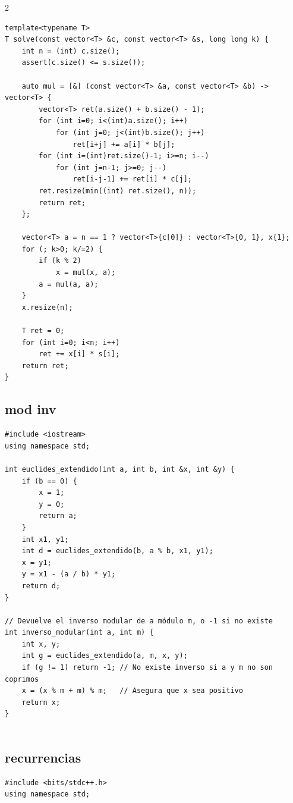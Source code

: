 \documentclass[twoside]{article}
\begin{document}
\begin{multicols*}{2}
\begin{verbatim}
template<typename T>
T solve(const vector<T> &c, const vector<T> &s, long long k) {
    int n = (int) c.size();
    assert(c.size() <= s.size());

    auto mul = [&] (const vector<T> &a, const vector<T> &b) -> vector<T> {
        vector<T> ret(a.size() + b.size() - 1);
        for (int i=0; i<(int)a.size(); i++)
            for (int j=0; j<(int)b.size(); j++)
                ret[i+j] += a[i] * b[j];
        for (int i=(int)ret.size()-1; i>=n; i--)
            for (int j=n-1; j>=0; j--)
                ret[i-j-1] += ret[i] * c[j];
        ret.resize(min((int) ret.size(), n));
        return ret;
    };

    vector<T> a = n == 1 ? vector<T>{c[0]} : vector<T>{0, 1}, x{1};
    for (; k>0; k/=2) {
        if (k % 2)
            x = mul(x, a);
        a = mul(a, a);
    }
    x.resize(n);

    T ret = 0;
    for (int i=0; i<n; i++)
        ret += x[i] * s[i];
    return ret;
}

\end{verbatim}

	{
		\subsection*{mod inv}
	}
	\begin{verbatim}
#include <iostream>
using namespace std;

int euclides_extendido(int a, int b, int &x, int &y) {
    if (b == 0) {
        x = 1;
        y = 0;
        return a;
    }
    int x1, y1;
    int d = euclides_extendido(b, a % b, x1, y1);
    x = y1;
    y = x1 - (a / b) * y1;
    return d;
}

// Devuelve el inverso modular de a módulo m, o -1 si no existe
int inverso_modular(int a, int m) {
    int x, y;
    int g = euclides_extendido(a, m, x, y);
    if (g != 1) return -1; // No existe inverso si a y m no son coprimos
    x = (x % m + m) % m;   // Asegura que x sea positivo
    return x;
}


\end{verbatim}

	{
		\subsection*{recurrencias}
	}
	\begin{verbatim}
#include <bits/stdc++.h>
using namespace std;


\end{verbatim}
\end{multicols*}
\end{document}
